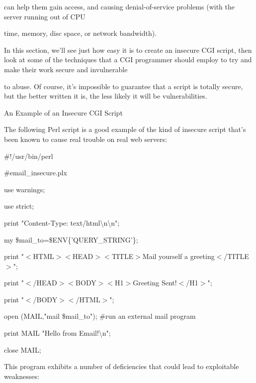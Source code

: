 \documentclass[a4paper,11pt]{book}
\begin{document}
\noindent can help them gain access, and causing denial-of-service problems (with the server running out of CPU

\noindent time, memory, disc space, or network bandwidth).

\noindent 

\noindent In this section, we'll see just how easy it is to create an insecure CGI script, then look at some of the techniques that a CGI programmer should employ to try and make their work secure and invulnerable

\noindent to abuse. Of course, it's impossible to guarantee that a script is totally secure, but the better written it is, the less likely it will be vulnerabilities.

\noindent 

\noindent An Example of an Insecure CGI Script

\noindent The following Perl script is a good example of the kind of insecure script that's been known to cause real trouble on real web servers:

\noindent 

\noindent \#!/usr/bin/perl

\noindent \#email\_insecure.plx

\noindent use warnings;

\noindent use strict;

\noindent print "Content-Type: text/html\textbackslash n\textbackslash n";

\noindent 

\noindent my \$mail\_to=\$ENV\{'QUERY\_STRING'\};

\noindent print "$<$HTML$>$$<$HEAD$>$$<$TITLE$>$Mail yourself a greeting$<$/TITLE$>$";

\noindent print "$<$/HEAD$>$$<$BODY$>$$<$H1$>$Greeting Sent!$<$/H1$>$";

\noindent print "$<$/BODY$>$$<$/HTML$>$";

\noindent 

\noindent 

\noindent open (MAIL,"\textbar mail \$mail\_to"); \#run an external mail program

\noindent print MAIL "Hello from Email!\textbackslash n";

\noindent close MAIL;

\noindent 

\noindent This program exhibits a number of deficiencies that could lead to exploitable weaknesses:

\noindent 
\end{document}
